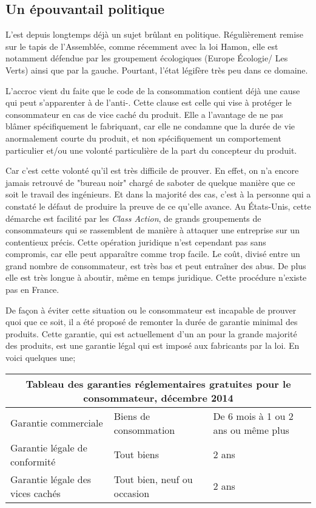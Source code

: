 \subsection{Un épouvantail politique}
L'\op est depuis longtemps déjà un sujet brûlant en politique. Régulièrement remise sur le tapis de l'Assemblée, comme récemment avec la loi Hamon, elle est notamment défendue par les groupement écologiques (Europe Écologie/ Les Verts) ainsi que par la gauche.
Pourtant, l'état légifère très peu dans ce domaine.

\medbreak L'accroc vient du faite que le code de la consommation contient déjà une cause qui peut s'apparenter à de l'anti-\op.
Cette clause est celle qui vise à protéger le consommateur en cas de vice caché du produit. 
Elle a l'avantage de ne pas blâmer spécifiquement le fabriquant, car elle ne condamne que la durée de vie anormalement courte du produit, et non spécifiquement un comportement particulier et/ou une volonté particulière de la part du concepteur du produit.

\smallbreak Car c'est cette volonté qu'il est très difficile de prouver. En effet, on n'a encore jamais retrouvé de "bureau noir" chargé de saboter de quelque manière que ce soit le travail des ingénieurs. Et dans la majorité des cas, c'est à la personne qui a constaté le défaut de produire la preuve de ce qu'elle avance.
\smallbreak Au États-Unis, cette démarche est facilité par les \textit{Class Action}, de grands groupements de consommateurs qui se rassemblent de manière à attaquer une entreprise sur un contentieux précis. Cette opération juridique n'est cependant pas sans compromis, car elle peut apparaître comme trop facile.
Le coût, divisé entre un grand nombre de consommateur, est très bas et peut entraîner des abus.
De plus elle est très longue à aboutir, même en temps juridique.
Cette procédure n'existe pas en France.

\smallbreak De façon à éviter cette situation ou le consommateur est incapable de prouver quoi que ce soit, il a été proposé de remonter la durée de garantie minimal des produits. Cette garantie, qui est actuellement d'un an pour la grande majorité des produits, est une garantie légal qui est imposé aux fabricants par la loi. 
En voici quelques une;

\begin{center}
\begin{tabular}{|l|l|p{5cm}|}
  \hline
  \multicolumn{3}{|c|}{Tableau des garanties réglementaires gratuites pour le consommateur, décembre 2014} \\
	\hline Garantie commerciale & Biens de consommation & De 6 mois à 1 ou 2 ans ou même plus\\
	       Garantie légale de conformité & Tout biens & 2 ans \\
	       Garantie légale des vices cachés & Tout bien, neuf ou occasion & 2 ans \\
	\hline
\end{tabular}
\end{center}

